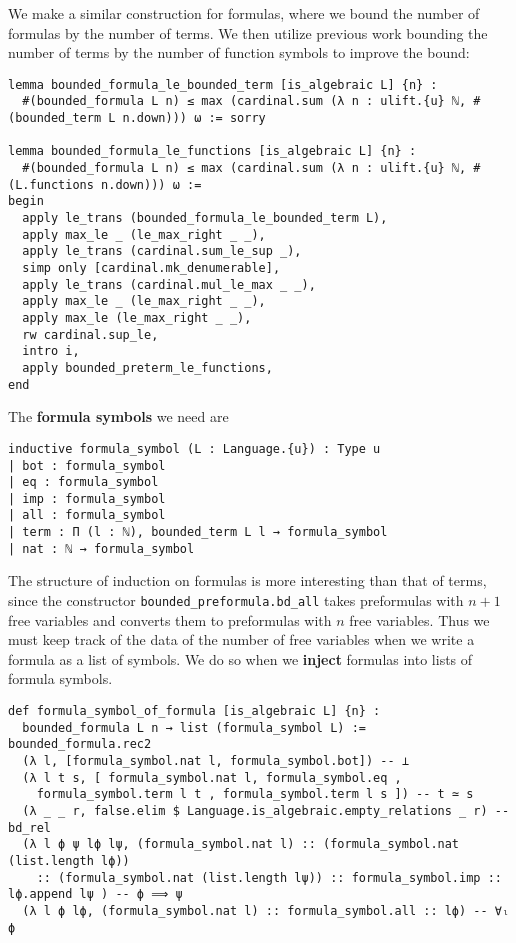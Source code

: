 \documentclass{article}
\newcommand{\<}{\langle}
\renewcommand{\>}{\rangle}
\theoremstyle{definitionstyle}
\theoremstyle{exercisestyle}
\theoremstyle{remarkstyle}
\begin{document}
We make a similar construction for formulas,
where we bound the number of formulas by the number of terms.
We then utilize previous work bounding the number of terms by the
number of function symbols to improve the bound:
\begin{lstlisting}
lemma bounded_formula_le_bounded_term [is_algebraic L] {n} :
  #(bounded_formula L n) ≤ max (cardinal.sum (λ n : ulift.{u} ℕ, #(bounded_term L n.down))) ω := sorry

lemma bounded_formula_le_functions [is_algebraic L] {n} :
  #(bounded_formula L n) ≤ max (cardinal.sum (λ n : ulift.{u} ℕ, #(L.functions n.down))) ω :=
begin
  apply le_trans (bounded_formula_le_bounded_term L),
  apply max_le _ (le_max_right _ _),
  apply le_trans (cardinal.sum_le_sup _),
  simp only [cardinal.mk_denumerable],
  apply le_trans (cardinal.mul_le_max _ _),
  apply max_le _ (le_max_right _ _),
  apply max_le (le_max_right _ _),
  rw cardinal.sup_le,
  intro i,
  apply bounded_preterm_le_functions,
end \end{lstlisting}

The \textbf{formula symbols} we need are

\begin{lstlisting}
inductive formula_symbol (L : Language.{u}) : Type u
| bot : formula_symbol
| eq : formula_symbol
| imp : formula_symbol
| all : formula_symbol
| term : Π (l : ℕ), bounded_term L l → formula_symbol
| nat : ℕ → formula_symbol \end{lstlisting}

The structure of induction on formulas is more interesting than
that of terms, since the constructor \texttt{bounded\_preformula.bd\_all} takes preformulas with $n + 1$ free variables and converts them to
preformulas with $n$ free variables.
Thus we must keep track of the data of the number of free variables
when we write a formula as a list of symbols.
We do so when we \textbf{inject} formulas into lists of formula symbols.

\begin{lstlisting}
def formula_symbol_of_formula [is_algebraic L] {n} :
  bounded_formula L n → list (formula_symbol L) :=
bounded_formula.rec2
  (λ l, [formula_symbol.nat l, formula_symbol.bot]) -- ⊥
  (λ l t s, [ formula_symbol.nat l, formula_symbol.eq ,
    formula_symbol.term l t , formula_symbol.term l s ]) -- t ≃ s
  (λ _ _ r, false.elim $ Language.is_algebraic.empty_relations _ r) -- bd_rel
  (λ l ϕ ψ lϕ lψ, (formula_symbol.nat l) :: (formula_symbol.nat (list.length lϕ))
    :: (formula_symbol.nat (list.length lψ)) :: formula_symbol.imp :: lϕ.append lψ ) -- ϕ ⟹ ψ
  (λ l ϕ lϕ, (formula_symbol.nat l) :: formula_symbol.all :: lϕ) -- ∀ₗ ϕ \end{lstlisting}
\end{document}
